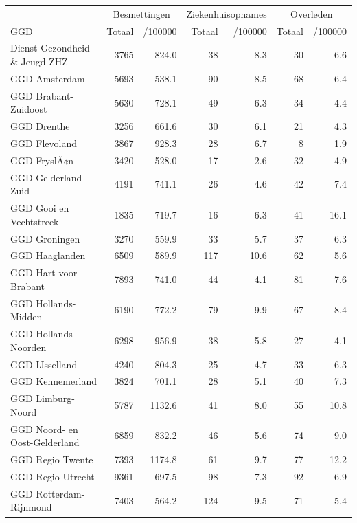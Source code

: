 \documentclass[
  english,
  man,floatsintext]{apa6}
\begin{document}
\begin{table}[H]
\centering\begingroup\fontsize{10}{12}\selectfont

\begin{threeparttable}
\begin{tabular}{lrrrrrr}
\toprule
\multicolumn{1}{c}{ } & \multicolumn{2}{c}{Besmettingen} & \multicolumn{2}{c}{Ziekenhuisopnames} & \multicolumn{2}{c}{Overleden} \\
\cmidrule(l{3pt}r{3pt}){2-3} \cmidrule(l{3pt}r{3pt}){4-5} \cmidrule(l{3pt}r{3pt}){6-7}
GGD & Totaal & /100000 & Totaal & /100000 & Totaal & /100000\\
\midrule
Dienst Gezondheid \& Jeugd ZHZ & 3765 & 824.0 & 38 & 8.3 & 30 & 6.6\\
GGD Amsterdam & 5693 & 538.1 & 90 & 8.5 & 68 & 6.4\\
GGD Brabant-Zuidoost & 5630 & 728.1 & 49 & 6.3 & 34 & 4.4\\
GGD Drenthe & 3256 & 661.6 & 30 & 6.1 & 21 & 4.3\\
GGD Flevoland & 3867 & 928.3 & 28 & 6.7 & 8 & 1.9\\
GGD FryslÃ¢n & 3420 & 528.0 & 17 & 2.6 & 32 & 4.9\\
GGD Gelderland-Zuid & 4191 & 741.1 & 26 & 4.6 & 42 & 7.4\\
GGD Gooi en Vechtstreek & 1835 & 719.7 & 16 & 6.3 & 41 & 16.1\\
GGD Groningen & 3270 & 559.9 & 33 & 5.7 & 37 & 6.3\\
GGD Haaglanden & 6509 & 589.9 & 117 & 10.6 & 62 & 5.6\\
GGD Hart voor Brabant & 7893 & 741.0 & 44 & 4.1 & 81 & 7.6\\
GGD Hollands-Midden & 6190 & 772.2 & 79 & 9.9 & 67 & 8.4\\
GGD Hollands-Noorden & 6298 & 956.9 & 38 & 5.8 & 27 & 4.1\\
GGD IJsselland & 4240 & 804.3 & 25 & 4.7 & 33 & 6.3\\
GGD Kennemerland & 3824 & 701.1 & 28 & 5.1 & 40 & 7.3\\
GGD Limburg-Noord & 5787 & 1132.6 & 41 & 8.0 & 55 & 10.8\\
GGD Noord- en Oost-Gelderland & 6859 & 832.2 & 46 & 5.6 & 74 & 9.0\\
GGD Regio Twente & 7393 & 1174.8 & 61 & 9.7 & 77 & 12.2\\
GGD Regio Utrecht & 9361 & 697.5 & 98 & 7.3 & 92 & 6.9\\
GGD Rotterdam-Rijnmond & 7403 & 564.2 & 124 & 9.5 & 71 & 5.4\\

\end{tabular}
\end{threeparttable}
\end{table}
\end{document}
